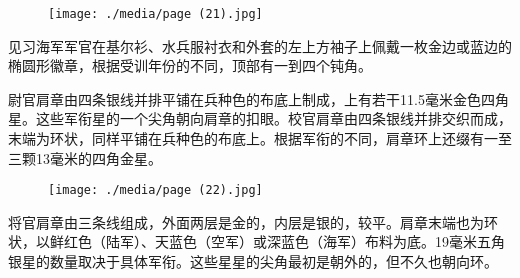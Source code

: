 \begin{figure}
\texttt{[image: ./media/page (21).jpg]}
\end{figure}

见习海军军官在基尔衫、水兵服衬衣和外套的左上方袖子上佩戴一枚金边或蓝边的椭圆形徽章，根据受训年份的不同，顶部有一到四个钝角。

尉官肩章由四条银线并排平铺在兵种色的布底上制成，上有若干11.5毫米金色四角星。这些军衔星的一个尖角朝向肩章的扣眼。校官肩章由四条银线并排交织而成，末端为环状，同样平铺在兵种色的布底上。根据军衔的不同，肩章环上还缀有一至三颗13毫米的四角金星。

\begin{figure}
\texttt{[image: ./media/page (22).jpg]}
\end{figure}

将官肩章由三条线组成，外面两层是金的，内层是银的，较平。肩章末端也为环状，以鲜红色（陆军）、天蓝色（空军）或深蓝色（海军）布料为底。19毫米五角银星的数量取决于具体军衔。这些星星的尖角最初是朝外的，但不久也朝向环。

